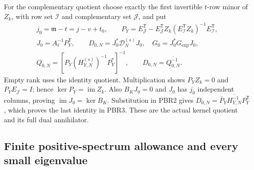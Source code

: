 \documentclass[11pt,a4paper]{article}
\begin{document}
For the complementary quotient choose exactly the first invertible
$t$-row minor of $Z_k$, with row set $\mathcal I$ and complementary
set $\mathcal J$, and put
\[
\begin{gathered}
 j_0=\mathfrak m-t=j-v+t_0,\qquad
 P_Y=E_{\mathcal J}^{\mathsf T}
 -E_{\mathcal J}^{\mathsf T}Z_k
 (E_{\mathcal I}^{\mathsf T}Z_k)^{-1}E_{\mathcal I}^{\mathsf T},\\
 J_0=A_\ell^{-1}P_Y^{\mathsf T},\qquad
 D_{0,N}=J_0^*\mathcal D_N^{(s)}J_0,\quad G_0=J_0^*G_{\exp}J_0,\\
 Q_{0,N}=[P_Y(H_{Y,N}^{(s)})^{-1}P_Y^*]^{-1},\qquad
 D_{0,N}=\overline{Q_{0,N}^{-1}}.
\end{gathered}\tag{PBR3}
\]
Empty rank uses the identity quotient. Multiplication shows
$P_YZ_k=0$ and $P_YE_{\mathcal J}=I$; hence
$\ker P_Y=\operatorname{im}Z_k$. Also $B_KJ_0=0$ and
$J_0$ has $j_0$ independent columns, proving
$\operatorname{im}J_0=\ker B_K$. Substitution in PBR2 gives
$D_{0,N}=\bar P_Y\overline{H_{Y,N}^{-1}}P_Y^{\mathsf T}$,
which proves the last identity in PBR3. These are the actual
kernel quotient and its full dual annihilator.

\subsection{Finite positive-spectrum allowance and every small eigenvalue}
\end{document}
